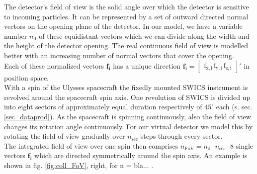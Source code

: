 The detector's field of view is the solid angle over which the detector is sensitive to incoming particles.
It can be represented by a set of outward directed normal vectors on the opening plane of the detector. In our model, we have a variable number $n_\mathrm{d}$ of these equidistant vectors which we can divide along the width and the height of the detector opening. The real continuous field of view is modelled better with an increasing number of normal vectors that cover the opening. \\
Each of these normalized vectors $\mathrm{\mathbf{f_i}}$ has a unique direction $\mathrm{\mathbf{f_i} = \begin{bmatrix}f_{x,i}\,f_{y,i}\,f_{z,i}\end{bmatrix}}'$ in position space.
\\
With a spin of the Ulysses spacecraft the fixedly mounted SWICS instrument is revolved around the spacecraft spin axis. One revolution of SWICS is divided up into eight sectors of approximately equal duration respectively of $45^\circ$ each (s. sec. \ref{sec_dataprod}). As the spacecraft is spinning continuously, also the field of view changes its rotation angle continuously. For our virtual detector we model this by rotating the field of view gradually over $n_\mathrm{sec}$ steps through every sector.\\
The integrated field of view over one spin then comprises $n_\mathrm{FoV} = n_\mathrm{d} \cdot n_\mathrm{sec} \cdot 8$ single vectors $\mathrm{\mathbf{f_i}}$ which are directed symmetrically around the spin axis. An example is shown in fig. \ref{fig:coll_FoV}, right, for n = bla... .
%
%
%
